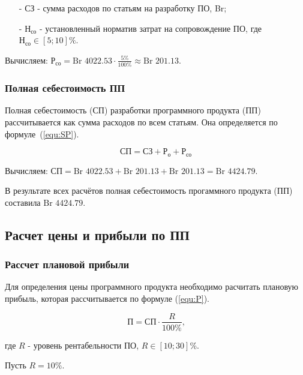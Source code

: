 \begin{enumerate}
    \item[-] $\text{СЗ}$ - сумма расходов по статьям на разработку ПО, Br; 
    \item[-] $\text{Н}_\text{со}$ - установленный норматив затрат на сопровождение ПО, где $\text{Н}_\text{со} \in [5;10]\%$.
\end{enumerate}

Вычисляем: $\text{Р}_\text{со} = \text{Br } 4022.53 \cdot \frac{ 5\% }{ 100\% } \approx \text{Br } 201.13$.

\subsubsection*{Полная себестоимость ПП}

Полная себестоимость ($\text{СП}$) разработки программного продукта (ПП)
рассчитывается как сумма расходов по всем статьям.
Она определяется по формуле~(\ref{equ:SP}). 

\begin{equation}
    \label{equ:SP}
    \text{СП} = \text{СЗ} + \text{Р}_\text{о} + \text{Р}_\text{со}
\end{equation}

Вычисляем: $\text{СП} = \text{Br } 4022.53 + \text{Br } 201.13 + \text{Br } 201.13 = \text{Br } 4424.79$.

В результате всех расчётов полная себестоимость прогаммного продукта (ПП) составила $\text{Br } 4424.79$.

\subsection{Расчет цены и прибыли по ПП}

\subsubsection*{Рассчет плановой прибыли}

Для определения цены программного продукта необходимо расчитать плановую прибыль,
которая рассчитывается по формуле (\ref{equ:P}).

\begin{equation}
    \label{equ:P}
    \text{П} = \text{СП} \cdot \frac{ R }{ 100\% } \text{,}
\end{equation}

где $R$ - уровень рентабельности ПО, $R \in [10;30]\%$.

Пусть $R = 10\%$.

